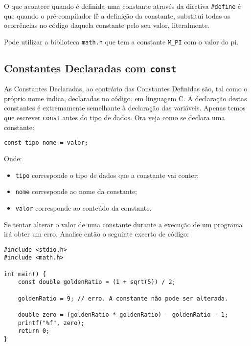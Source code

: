 O que acontece quando é definida uma constante através da diretiva \texttt{\#define} é que quando o pré-compilador lê a definição da constante, substitui todas as ocorrências no código daquela constante pelo seu valor, literalmente. 

\begin{mdframed}[backgroundcolor=cinzaclaro, linewidth=0pt]
Pode utilizar a biblioteca \texttt{math.h} que tem a constante \texttt{M\_PI} com o valor do pi.
\end{mdframed}

\subsection{Constantes Declaradas com \texttt{const}}

As Constantes Declaradas, ao contrário das Constantes Definidas são, tal como o próprio nome indica, declaradas no código, em linguagem C. A declaração destas constantes é extremamente semelhante à declaração das variáveis. Apenas temos que escrever \texttt{const} antes do tipo de dados. Ora veja como se declara uma constante:

\begin{lstlisting}
const tipo nome = valor;
\end{lstlisting}

Onde:

\begin{itemize}
\item \texttt{tipo} corresponde o tipo de dados que a constante vai conter;
\item \texttt{nome} corresponde ao nome da constante;
\item \texttt{valor} corresponde ao conteúdo da constante.
\end{itemize}

Se tentar alterar o valor de uma constante durante a execução de um programa irá obter um erro. Analise então o seguinte excerto de código:

\begin{lstlisting}
#include <stdio.h>
#include <math.h>
 
int main() {
    const double goldenRatio = (1 + sqrt(5)) / 2;
 
    goldenRatio = 9; // erro. A constante não pode ser alterada.
 
    double zero = (goldenRatio * goldenRatio) - goldenRatio - 1;
    printf("%f", zero);
    return 0;
}    
\end{lstlisting}

